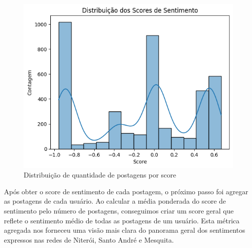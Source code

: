\begin{figure}[!htb]
	\caption{Distribuição de quantidade de postagens por score}
	\label{fig:score_distribution}
	\centering
	\includegraphics[scale=0.90]{images/score_distribution.png}
	\fautor
\end{figure}

Após obter o score de sentimento de cada postagem, o próximo passo foi agregar as postagens de cada usuário. Ao calcular a média ponderada do score de sentimento pelo número de postagens, conseguimos criar um score geral que reflete o sentimento médio de todas as postagens de um usuário. Esta métrica agregada nos forneceu uma visão mais clara do panorama geral dos sentimentos expressos nas redes de Niterói, Santo André e Mesquita.

